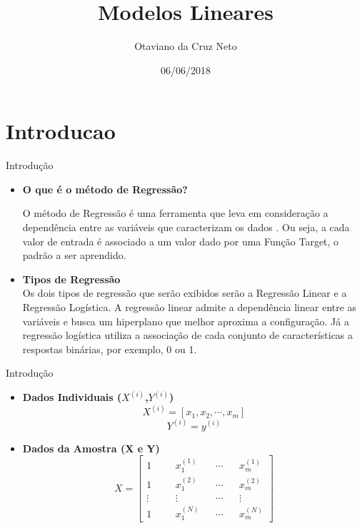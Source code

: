 \documentclass{beamer}
\title[Linear Model]{Modelos Lineares}
\author{Otaviano da Cruz Neto}
\institute{Instituto de Ciencias Exatas - ICEX / UFF }
\date{06/06/2018}
\begin{document}
\begin{frame}
  \titlepage
\end{frame}
\section{Introducao}
\begin{frame}{Introdução}
\begin{itemize}
\item \textbf{O que é o método de Regressão?}

O método de Regressão é uma ferramenta que leva em consideração a dependência entre as variáveis que caracterizam os dados . Ou seja, a cada valor de entrada é associado a um valor dado por uma Função Target, o padrão a ser aprendido.

\item \textbf{Tipos de Regressão}\\
Os dois tipos de regressão que serão exibidos serão a Regressão Linear e a Regressão Logística. A regressão linear admite a dependência linear entre as variáveis e busca um hiperplano que melhor aproxima a configuração. Já a regressão logística utiliza a associação de cada conjunto de características a respostas binárias, por exemplo, 0 ou 1.    
\end{itemize}
\end{frame}
\begin{frame}{Introdução}

\begin{itemize}
  
  \item \textbf{Dados Individuais ($X^{(i)}$,$Y^{(i)}$)}
  \begin{equation}
  X^{(i)} = \left[  x_1, x_2, \cdots, x_m \right] 
  \end{equation}
  \begin{equation}
  Y^{(i)} = y^{(i)}  
  \end{equation}
  \item \textbf{Dados da Amostra (X e Y)}
  \begin{equation}
 X = \left[ \begin{array}{rrccccrr}
1 &&& x_1^{(1)} && \cdots && x_m^{(1)} \\ 
1 &&& x_1^{(2)} && \cdots && x_m^{(2)} \\
\vdots &&& \vdots && \cdots && \vdots \\
1 &&& x_1^{(N)} && \cdots && x_m^{(N)} 

\end{array} \right]
  \end{equation}
  \end{itemize}
  \end{frame}
  
\end{document}
